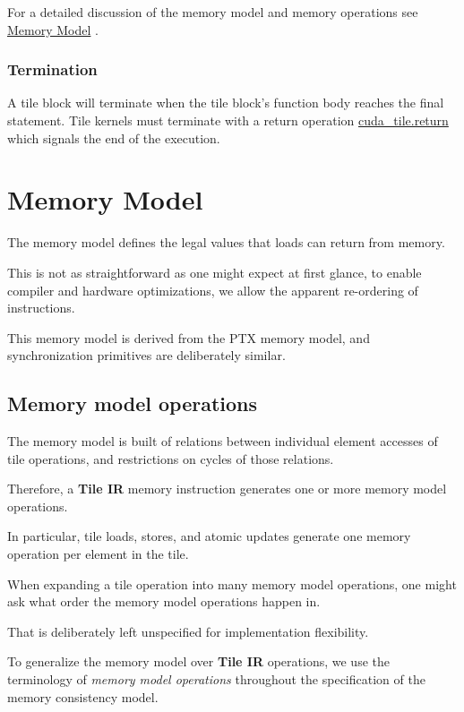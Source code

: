 \documentclass{article}
\begin{document}
For a detailed discussion of the memory model and memory operations see \href{https://docs.nvidia.com/cuda/tile-ir/latest/sections/memory_model.html#section-memory-model}{Memory Model} .



\subsubsection{Termination}

A tile block will terminate when the tile block's function body reaches the final statement. Tile kernels must terminate with a return operation \href{https://docs.nvidia.com/cuda/tile-ir/latest/sections/operations.html#op-cuda-tile-return}{cuda\_tile.return} which signals the end of the execution.


\newpage
\section{Memory Model}

The memory model defines the legal values that loads can return from memory.

This is not as straightforward as one might expect at first glance, to enable compiler and hardware optimizations, we allow the apparent re-ordering of instructions.


This memory model is derived from the PTX memory model, and synchronization primitives are deliberately similar.


\subsection{Memory model operations}

The memory model is built of relations between individual element accesses of tile operations, and restrictions on cycles of those relations.

Therefore, a \textbf{Tile IR} memory instruction generates one or more memory model operations.

In particular, tile loads, stores, and atomic updates generate one memory operation per element in the tile.

When expanding a tile operation into many memory model operations, one might ask what order the memory model operations happen in.

That is deliberately left unspecified for implementation flexibility.


To generalize the memory model over \textbf{Tile IR} operations, we use the terminology of \textit{memory model operations} throughout the specification of the memory consistency model.
\end{document}

